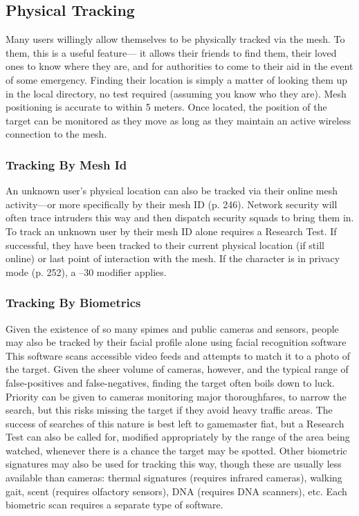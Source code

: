 \subsection{Physical Tracking}

Many users willingly allow themselves to be physically 
tracked via the mesh. To them, this is a useful feature—
it allows their friends to find them, their loved ones to 
know where they are, and for authorities to come to 
their aid in the event of some emergency. Finding their 
location is simply a matter of looking them up in the 
local directory, no test required (assuming you know 
who they are). Mesh positioning is accurate to within 
5 meters. Once located, the position of the target can 
be monitored as they move as long as they maintain 
an active wireless connection to the mesh.

\subsubsection{Tracking By Mesh Id}

An unknown user's physical location can also be 
tracked via their online mesh activity—or more specifically
by their mesh ID (p. 246). Network security
will often trace intruders this way and then dispatch 
security squads to bring them in. To track an unknown 
user by their mesh ID alone requires a Research Test. 
If successful, they have been tracked to their current 
physical location (if still online) or last point of interaction
with the mesh. If the character is in privacy
mode (p. 252), a –30 modifier applies.

\subsubsection{Tracking By Biometrics}

Given the existence of so many spimes and public 
cameras and sensors, people may also be tracked by 
their facial profile alone using facial recognition software
This software scans accessible video feeds and
attempts to match it to a photo of the target. Given 
the sheer volume of cameras, however, and the typical 
range of false-positives and false-negatives, finding 
the target often boils down to luck. Priority can be 
given to cameras monitoring major thoroughfares, to 
narrow the search, but this risks missing the target if 
they avoid heavy traffic areas. The success of searches 
of this nature is best left to gamemaster fiat, but a 
Research Test can also be called for, modified appropriately
by the range of the area being watched,
whenever there is a chance the target may be spotted.
Other biometric signatures may also be used for 
tracking this way, though these are usually less available
than cameras: thermal signatures (requires infrared
cameras), walking gait, scent (requires olfactory
sensors), DNA (requires DNA scanners), etc. Each 
biometric scan requires a separate type of software.

